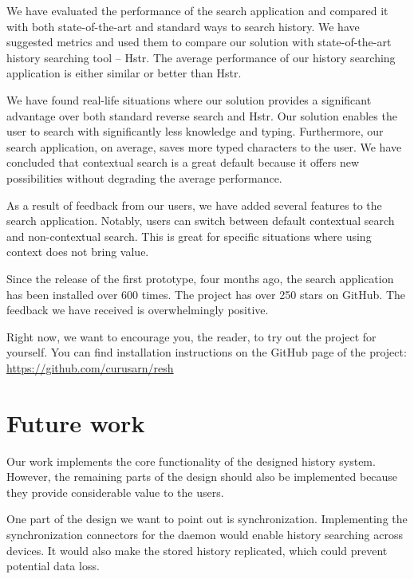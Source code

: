 \documentclass[thesis=M,english]{FITthesis}[2012/10/20]
\let\myCite\cite
\renewcommand\cite{\unskip~\myCite}
\begin{document}
\begin{conclusion}

We have evaluated the performance of the search application and compared it with both state-of-the-art and standard ways to search history. 
We have suggested metrics and used them to compare our solution with state-of-the-art history searching tool -- Hstr.%
The average performance of our history searching application is either similar or better than Hstr. 

We have found real-life situations where our solution provides a significant advantage over both standard reverse search and Hstr.
Our solution enables the user to search with significantly less knowledge and typing. Furthermore, our search application, on average, saves more typed characters to the user. 
We have concluded that contextual search is a great default because it offers new possibilities without degrading the average performance.


As a result of feedback from our users, we have added several features to the search application. Notably, users can switch between default contextual search and non-contextual search. This is great for specific situations where using context does not bring value.

Since the release of the first prototype, four months ago, the search application has been installed over 600 times. The project has over 250 stars on GitHub. The feedback we have received is overwhelmingly positive. %

Right now, we want to encourage you, the reader, to try out the project for yourself. You can find installation instructions on the GitHub page of the project: \url{https://github.com/curusarn/resh} %


\section*{Future work}

Our work implements the core functionality of the designed history system. However, the remaining parts of the design should also be implemented because they provide considerable value to the users.

One part of the design we want to point out is synchronization.
Implementing the synchronization connectors for the daemon would enable history searching across devices. It would also make the stored history replicated, which could prevent potential data loss.


\end{conclusion}
\end{document}
